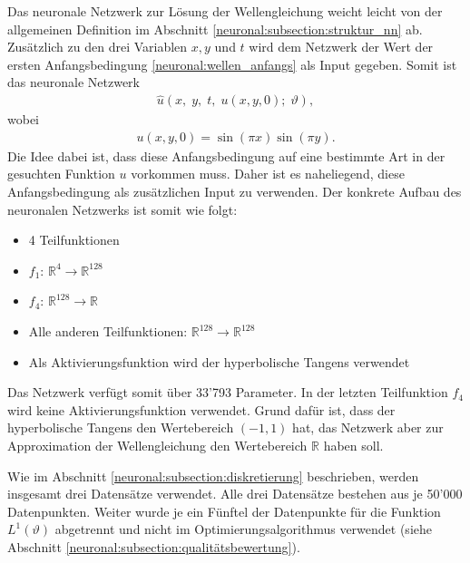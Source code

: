 Das neuronale Netzwerk zur Lösung der Wellengleichung weicht leicht von der allgemeinen Definition im Abschnitt \ref{neuronal:subsection:struktur_nn} ab.
Zusätzlich zu den drei Variablen $x, y$ und $t$ wird dem Netzwerk der Wert der ersten Anfangsbedingung \eqref{neuronal:wellen_anfangs} als Input gegeben.
Somit ist das neuronale Netzwerk
\begin{align*}
    \hat{u}(x,\; y,\; t,\; u(x, y, 0);\; \vartheta),
\end{align*}
wobei
\begin{align*}
    u(x, y, 0) = \sin(\pi x) \sin(\pi y).
\end{align*}
Die Idee dabei ist, dass diese Anfangsbedingung auf eine bestimmte Art in der gesuchten Funktion $u$ vorkommen muss.
Daher ist es naheliegend, diese Anfangsbedingung als zusätzlichen Input zu verwenden.
Der konkrete Aufbau des neuronalen Netzwerks ist somit wie folgt:
\begin{itemize}
    \item 4 Teilfunktionen
    \item \( f_1 \): \( \mathbb{R}^4 \longrightarrow \mathbb{R}^{128} \) 
    \item \( f_{4} \): \( \mathbb{R}^{128} \longrightarrow \mathbb{R} \)
    \item Alle anderen Teilfunktionen: \( \mathbb{R}^{128} \longrightarrow \mathbb{R}^{128} \)
    \item Als Aktivierungsfunktion wird der hyperbolische Tangens verwendet
\end{itemize}
Das Netzwerk verfügt somit über 33'793 Parameter.
In der letzten Teilfunktion \( f_{4} \) wird keine Aktivierungsfunktion verwendet.
Grund dafür ist, dass der hyperbolische Tangens den Wertebereich \((-1, 1)\) hat, das Netzwerk aber zur Approximation der Wellengleichung den Wertebereich \( \mathbb{R} \) haben soll.

Wie im Abschnitt \ref{neuronal:subsection:diskretierung} beschrieben, werden insgesamt drei Datensätze verwendet.
Alle drei Datensätze bestehen aus je 50'000 Datenpunkten.
Weiter wurde je ein Fünftel der Datenpunkte für die Funktion \( L^1(\vartheta) \) abgetrennt und nicht im Optimierungsalgorithmus verwendet (siehe Abschnitt \ref{neuronal:subsection:qualitätsbewertung}).

